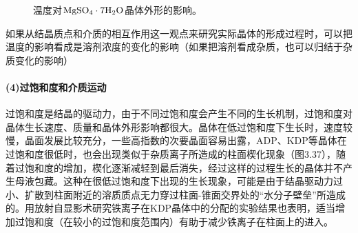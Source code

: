 \begin{figure}[htbp]
 \centering
 
 \caption{温度对$\rm MgSO_4\cdot 7H_2O$晶体外形的影响。}

\end{figure}

如果从结晶质点和介质的相互作用这一观点来研究实际晶体的形成过程时，可以把温度的影响看成是溶剂浓度的变化的影响（如果把溶剂看成杂质，也可以归结于杂质变化的影响）


\paragraph{(4)过饱和度和介质运动}过饱和度是结晶的驱动力，由于不同过饱和度会产生不同的生长机制，过饱和度对晶体生长速度、质量和晶体外形影响都很大。晶体在低过饱和度下生长时，速度较慢，晶面发展比较充分，一些高指数的次要晶面容易出露，ADP、KDP等晶体在过饱和度很低时，也会出现类似于杂质离子所造成的柱面楔化现象（图3.37），随着过饱和度的增加，楔化逐渐减轻到最后消失，经过这样的过程生长的晶体并不产生母液包藏。这种在很低过饱和度下出现的生长现象，可能是由于结晶驱动力过小、扩散到柱面附近的溶质质点无力穿过柱面-锥面交界处的“水分子壁垒”所造成的。用放射自显影术研究铁离子在KDP晶体中的分配的实验结果也表明，适当增加过饱和度（在较小的过饱和度范围内）有助于减少铁离子在柱面上的进入。


